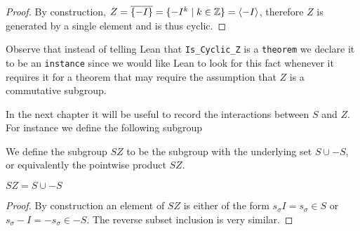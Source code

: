 \begin{lemma}[$Z$ is cyclic]
    \label{SpecialSubgroups.IsCyclic_Z}
    \leanok
\end{lemma}
\begin{proof}
\leanok
    By construction, $Z = \overline{\{-I\}} = \{-I^k \; | \; k \in \mathbb{Z} \} = \langle -I \rangle$, therefore $Z$ is generated by a single element and is thus cyclic.
\end{proof}


\begin{remark}
    Observe that instead of telling Lean that \texttt{Is\_Cyclic\_Z} is a \texttt{theorem} we declare it to be
    an \texttt{instance} since we would like Lean to look for this fact whenever it requires it for a
    theorem that may require the assumption that $Z$ is a commutative subgroup.
\end{remark}

In the next chapter it will be useful to record the interactions between $S$ and $Z$. 
For instance we define the following subgroup

\begin{definition}
    \label{SpecialSubgroups.SZ}
    \leanok
    We define the subgroup $SZ$ to be the subgroup with the underlying set $S \cup -S$, or equivalently the pointwise product $SZ$.
\end{definition}



\begin{corollary}
\label{SpecialSubgroups.S_mul_Z_subset_SZ}
$SZ = S \cup -S$
\leanok
\end{corollary}
\begin{proof}
\leanok
    By construction an element of $SZ$ is either of the form $s_\sigma  I = s_\sigma \in S$ or $s_\sigma -I = -s_\sigma\in -S$. The reverse subset inclusion is very similar.
\end{proof}


